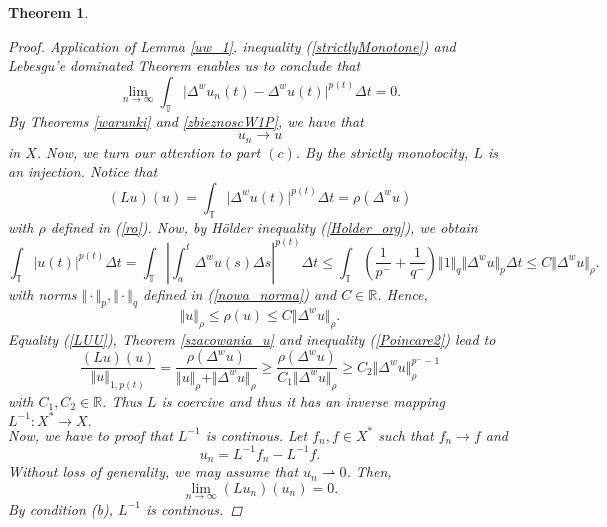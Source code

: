 \documentclass[12pt,a4paper,oneside,titlepage]{article}
\newtheorem{Twierdzenie}{Theorem}
\begin{document}
\begin{Twierdzenie}
\begin{proof}
Application of Lemma \ref{uw_1}, inequality (\ref{strictlyMonotone}) and Lebesgu'e dominated Theorem enables us to conclude that
 \begin{equation}
 \lim_{n \rightarrow \infty} \int_{\mathbb{T}} \vert \Delta^{w} u_n(t) -\Delta^{w} u(t) \vert^{p(t)} \Delta t =0. 
 \end{equation}
By Theorems \ref{warunki} and \ref{zbieznoscW1P}, we have that 
\begin{equation}
u_n \rightarrow u
\end{equation}
in $X$.
Now, we turn our attention to part $(c)$. By the strictly monotocity, $L$ is an injection. Notice that
\begin{equation}
\label{LUU}
(Lu)(u)= \int_{\mathbb{T}} \vert \Delta^{w} u(t) \vert^{p(t)} \Delta t = \rho ( \Delta^{w} u )
\end{equation}
with $\rho$ defined in (\ref{ro}). Now, by Hölder inequality (\ref{Holder_org}), we obtain
\begin{equation}
\nonumber
 \int_{\mathbb{T}} \vert u(t) \vert^{p(t)} \Delta t = \int_{\mathbb{T}} \left\vert \int_a^t \Delta^{w} u(s) \Delta s \right\vert^{p(t)} \Delta t \leq \int_{\mathbb{T}} \left( \frac{1}{p^-}+\frac{1}{q^-} \right) \Vert 1 \Vert_{q} \Vert \Delta^{w} u \Vert_{p} \Delta t \leq C \Vert\Delta^{w}  u \Vert_{\rho}.
\end{equation}
with norms $\Vert \cdot \Vert_{p}, \Vert \cdot \Vert_{q}$ defined in (\ref{nowa_norma}) and $C \in \mathbb{R}$. Hence,
\begin{equation}
\label{Poincare2}
\Vert u \Vert_{\rho} \leq \rho(u) \leq C \Vert \Delta^{w} u \Vert_{\rho}.
\end{equation}
   Equality (\ref{LUU}), Theorem \ref{szacowania_u} and inequality (\ref{Poincare2}) lead to
\begin{equation}
\nonumber
\frac{(Lu)(u)}{\Vert u \Vert_{1,p(t)}} = \frac{\rho ( \Delta^{w} u )}{\Vert u \Vert_{\rho} + \Vert \Delta^{w}u \Vert_{\rho}} \geq \frac{\rho ( \Delta^{w} u )}{C_1 \Vert \Delta^{w}u \Vert_{\rho} } \geq C_2 \Vert \Delta^{w}u \Vert_{\rho}^{p^{-}-1} 
\end{equation}
with $C_1, C_2 \in \mathbb{R}$. Thus $L$ is coercive and thus it has an inverse mapping $L^{-1}: X^{*} \rightarrow X.$  \\
\indent
Now, we have to proof that $L^{-1}$ is continous. 
 Let $f_n, f \in X^*$ such that $f_n \rightarrow f$ and
\begin{equation}
\nonumber
u_n = L^{-1}f_n -L^{-1}f .
\end{equation} 
 Without loss of generality, we may assume that $u_n \rightharpoonup 0$. Then,
\begin{equation}
\nonumber
\lim_{n \rightarrow \infty} (Lu_n)(u_n)=0.
\end{equation}
By condition (b), $L^{-1}$ is continous.
\end{proof}
\end{Twierdzenie}
\end{document}
